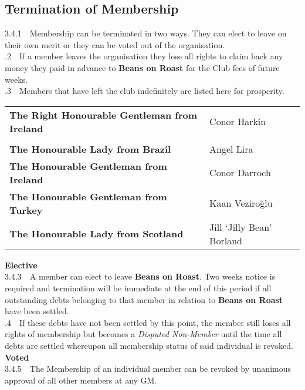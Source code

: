 \documentclass[a4paper,11pt]{article}
\begin{document}
\subsection{Termination of Membership}
\label{Termination of Membership}
3.4.1$\quad$Membership can be terminated in two ways. They can elect to leave on their own merit or they can be voted out of the organisation. \\

.2$\quad$If a member leaves the organisation they lose all rights to claim back any money they paid in advance to \textbf{Beans on Roast} for the Club fees of future weeks.\\

.3$\quad$Members that have left the club indefinitely are listed here for prosperity.
\begin{table}[h!]
\begin{tabular}{ll}
\textbf{The Right Honourable Gentleman from Ireland} & Conor Harkin \\
\textbf{} &  \\
\textbf{The Honourable Lady from Brazil} & Angel Lira \\
\textbf{The Honourable Gentleman from Ireland} & Conor Darroch \\
\textbf{The Honourable Gentleman from Turkey} & Kaan Veziro\u glu \\
\textbf{The Honourable Lady from Scotland} & Jill `Jilly Bean' Borland
\end{tabular}
\end{table}

\noindent \textbf{Elective}\\
3.4.3$\quad$A member can elect to leave \textbf{Beans on Roast}. Two weeks notice is required and termination will be immediate at the end of this period if all outstanding debts belonging to that member in relation to \textbf{Beans on Roast} have been settled. \\

.4$\quad$If these debts have not been settled by this point, the member still loses all rights of membership but becomes a \textit{Disputed Non-Member} until the time all debts are settled whereupon all membership status of said individual is revoked.\\

\noindent \textbf{Voted}  \\
3.4.5$\quad$The Membership of an individual member can be revoked by unanimous approval of all other members at any GM.\\ 
\end{document}

